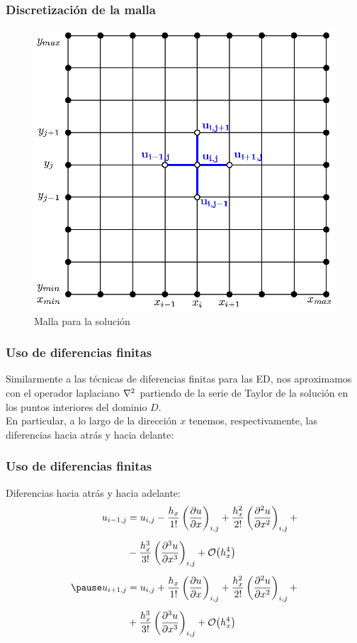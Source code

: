\documentclass[12pt]{beamer}
\begin{document}
\begin{frame}
\frametitle{Discretización de la malla}
\begin{figure}
    \centering
    \includegraphics[scale=0.65]{Imagenes/mallaSolucionEDP_01.eps}
    \caption{Malla para la solución}
    \label{fig:figura_01}
\end{figure}
\end{frame}
\begin{frame}
\frametitle{Uso de diferencias finitas}
Similarmente a las técnicas de diferencias finitas para las ED, nos aproximamos con el operador laplaciano $\laplacian$ partiendo de la serie de Taylor de la solución en los puntos interiores del dominio $D$.
\\
\bigskip
\pause
En particular, a lo largo de la dirección $x$ tenemos, respectivamente, las diferencias hacia atrás y hacia delante:
\end{frame}
\begin{frame}
\frametitle{Uso de diferencias finitas}
Diferencias hacia atrás y hacia adelante:
\pause
\fontsize{12}{12}\selectfont
\begin{eqnarray*}
\begin{aligned}
u_{i-1, j} &= u_{i, j} - \dfrac{h_{x}}{1!} \left( \pdv{u}{x} \right)_{i, j} + \dfrac{h_{x}^{2}}{2!} \left( \pdv[2]{u}{x} \right)_{i, j} + \\[0.5em]
&- \dfrac{h_{x}^{3}}{3!} \left( \pdv[3]{u}{x} \right)_{i, j} + \order{h_{x}^{4}}  \\[0.5em] \pause
u_{i+1, j} &= u_{i, j} + \dfrac{h_{x}}{1!} \left( \pdv{u}{x} \right)_{i, j} + \dfrac{h_{x}^{2}}{2!} \left( \pdv[2]{u}{x} \right)_{i, j} + \\[0.5em]
&+ \dfrac{h_{x}^{3}}{3!} \left( \pdv[3]{u}{x} \right)_{i, j} + \order{h_{x}^{4}}
\end{aligned}
\end{eqnarray*}
\end{frame}
\end{document}
